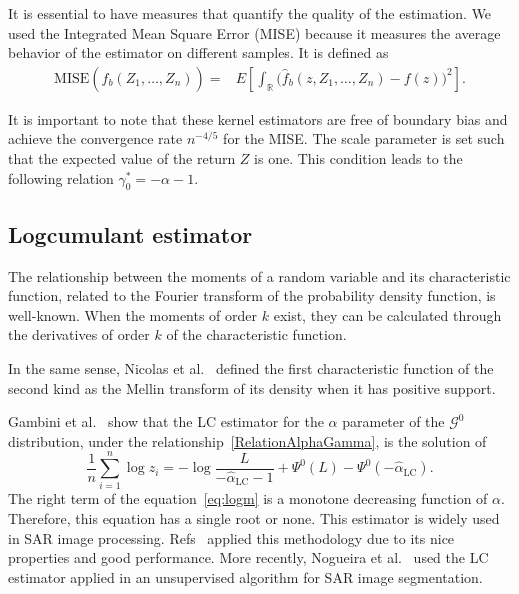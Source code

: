 \documentclass[twocolumn]{svjour3}
\begin{document}
It is essential to have measures that quantify the quality of the estimation. 
We used the Integrated Mean Square Error (MISE) because it measures the average behavior of the estimator on different samples. 
It is defined as
\begin{align}
\label{Mise}
\text{MISE}(\widehat{f}_b(Z_1,\ldots,Z_n))=&E\left[\int_\mathbb{R} \big(\widehat{f}_b(z,Z_1,\ldots,Z_n)-f(z)\big)^2 \right].
\end{align}

It is important to note that these kernel estimators are free of boundary bias and achieve the convergence rate $n^{-4/5}$ for the MISE.
The scale parameter is set such that the expected value of the return $Z$ is one. 
This condition leads to the following relation $\gamma_0^*=-\alpha-1$.

\subsection{Logcumulant estimator}\label{lc}

The relationship between the moments of a random variable and its characteristic function, related to the Fourier transform of the probability density function, is well-known. 
When the moments of order $k$ exist, they can be calculated through the derivatives of order $k$ of the characteristic function.

In the same sense, Nicolas et al.~\cite{nicolas2002} defined the first characteristic function of the second kind as the Mellin transform of its density when it has positive support. 

Gambini et al.~\cite{gambini2015} show that the LC estimator for the $\alpha$ parameter of the $\mathcal{G}^0$ distribution, under the relationship~\eqref{RelationAlphaGamma}, is the solution of 
\begin{equation} \label{eq:logm}
\frac{1}{n} \sum_{i=1}^n\log z_i =   -\log \frac{L}{-\widehat\alpha_{\text{{LC}}}-1} + \Psi^0(L) - \Psi^0(-\widehat\alpha_{\text{{LC}}}).
\end{equation}
The right term of the equation~\eqref{eq:logm} is a monotone decreasing function of $\alpha$. Therefore, this equation has a single root or none. 
This estimator is widely used in SAR image processing. 
Refs~\cite{MellinAnalysisPolSAR,BujorTrouveValetNicolas2004,khan2014} applied this methodology due to its nice properties and good performance. 
More recently, Nogueira et al.~\cite{Nogueira2019} used the LC estimator applied in an unsupervised algorithm for SAR image segmentation.
\end{document}
